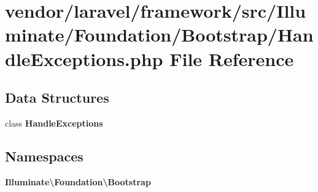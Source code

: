\section{vendor/laravel/framework/src/\+Illuminate/\+Foundation/\+Bootstrap/\+Handle\+Exceptions.php File Reference}
\label{_handle_exceptions_8php}
\subsection*{Data Structures}
\begin{DoxyCompactItemize}
\item 
class {\bf Handle\+Exceptions}
\end{DoxyCompactItemize}
\subsection*{Namespaces}
\begin{DoxyCompactItemize}
\item 
 {\bf Illuminate\textbackslash{}\+Foundation\textbackslash{}\+Bootstrap}
\end{DoxyCompactItemize}
